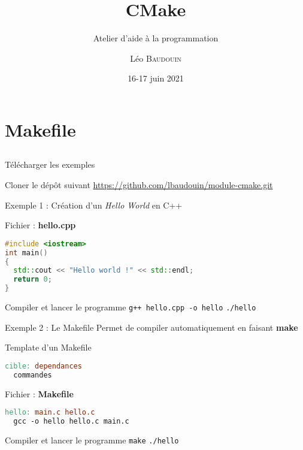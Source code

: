 \documentclass{beamer}
\title{CMake}
\subtitle{Atelier d'aide à la programmation}
\author{L\'eo \textsc{Baudouin}}
\institute{
  {\url{baudouin.leo @ gmail.com}}
}
\date{16-17 juin 2021}
\begin{document}
\begin{frame}
  \titlepage
\end{frame}

\section{Makefile}
\subsection{}

\begin{frame}[fragile]{Télécharger les exemples}
  \begin{block}{Cloner le dép\^ot suivant}
    \url{https://github.com/lbaudouin/module-cmake.git}
  \end{block}
\end{frame}

\begin{frame}[fragile]{Exemple 1 : Création d'un \textit{Hello World} en C++}

  \begin{block}{Fichier : \textbf{hello.cpp}}
  \begin{lstlisting}[language=C++]
#include <iostream>
int main()
{
  std::cout << "Hello world !" << std::endl;
  return 0;
}
\end{lstlisting}
  \end{block}
  \pause

  \begin{block}{Compiler et lancer le programme}
    \textcolor{commandcolor}{\verb?g++ hello.cpp -o hello?}\linebreak
    \textcolor{commandcolor}{\verb?./hello?}
  \end{block}

\end{frame}

\begin{frame}[fragile]{Exemple 2 : Le Makefile}
  Permet de compiler automatiquement en faisant \textbf{make}

  \begin{exampleblock}{Template d'un Makefile}
  \begin{lstlisting}[language=make]
cible: dependances
  commandes
\end{lstlisting}
  \end{exampleblock}
  \pause

  \begin{block}{Fichier : \textbf{Makefile}}
  \begin{lstlisting}[language=make]
hello: main.c hello.c
  gcc -o hello hello.c main.c
\end{lstlisting}
  \end{block}
  \pause

  \begin{block}{Compiler et lancer le programme}
    \textcolor{commandcolor}{\verb?make?}\linebreak
    \textcolor{commandcolor}{\verb?./hello?}
  \end{block}
  
\end{frame}
\end{document}
